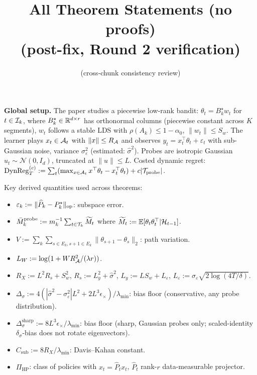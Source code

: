 

\title{All Theorem Statements (no proofs)\\(post-fix, Round 2 verification)}
\author{(cross-chunk consistency review)}
\date{}


\maketitle

\textbf{Global setup.} The paper studies a piecewise low-rank bandit:
$\theta_t = B_k^\star w_t$ for $t \in \mathcal{I}_k$, where $B_k^\star \in \mathbb{R}^{d\times r}$
has orthonormal columns (piecewise constant across $K$ segments),
$w_t$ follows a stable LDS with $\rho(A_k) \le 1-\alpha_0$,
$\|w_t\| \le S_w$. The learner plays $x_t \in \mathcal{A}_t$ with $\|x\|\le R_{\mathcal{A}}$
and observes $y_t = x_t^\top \theta_t + \varepsilon_t$ with sub-Gaussian
noise, variance $\sigma_\varepsilon^2$ (estimated: $\hat\sigma^2$).
Probes are isotropic Gaussian $u_t \sim \mathcal N(0, I_d)$, truncated
at $\|u\|\le L$. Costed dynamic regret:
$\mathrm{DynReg}_T^{(c)} := \sum_t(\max_{x\in\mathcal{A}_t}x^\top\theta_t - x_t^\top\theta_t) + c|\mathcal{T}_{\mathrm{probe}}|$.

Key derived quantities used across theorems:
\begin{itemize}[leftmargin=*,itemsep=1pt,topsep=1pt]
  \item $\varepsilon_k := \|\widehat P_k - P_k^\star\|_{\mathrm{op}}$: subspace error.
  \item $\bar M_k^{\mathrm{probe}} := m_k^{-1}\sum_{t\in\mathcal{T}_k}\widetilde M_t$
        where $\widetilde M_t := \mathbb{E}[\theta_t\theta_t^\top|\mathcal{H}_{t-1}]$.
  \item $V := \sum_k\sum_{s\in E_k, s+1\in E_k}\|\theta_{s+1}-\theta_s\|_2$:
        path variation.
  \item $L_W := \log(1+WR_{\mathcal{A}}^2/(\lambda r))$.
  \item $R_X := L^2 R_s + S_w^2$, $R_s := L_y^2 + \hat\sigma^2$,
        $L_y := LS_w + L_\varepsilon$, $L_\varepsilon := \sigma_\varepsilon\sqrt{2\log(4T/\delta)}$.
  \item $\Delta_\sigma := 4(|\hat\sigma^2-\sigma_\varepsilon^2|L^2 + 2L^3\epsilon_\times)/\lambda_{\min}$:
        bias floor (conservative, any probe distribution).
  \item $\Delta_\sigma^{\mathrm{sharp}} := 8L^3\epsilon_\times/\lambda_{\min}$:
        bias floor (sharp, Gaussian probes only; scaled-identity
        $\delta_\sigma$-bias does not rotate eigenvectors).
  \item $C_{\mathrm{sub}} := 8R_X/\lambda_{\min}$: Davis--Kahan constant.
  \item $\Pi_{\mathrm{HP}}$: class of policies with $x_t = \widehat P_t x_t$,
        $\widehat P_t$ rank-$r$ data-measurable projector.
\end{itemize}

